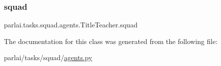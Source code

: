 \subsubsection{\texorpdfstring{squad}{squad}}
{\footnotesize\ttfamily parlai.\+tasks.\+squad.\+agents.\+Title\+Teacher.\+squad}



The documentation for this class was generated from the following file\+:\begin{DoxyCompactItemize}
\item 
parlai/tasks/squad/\hyperlink{parlai_2tasks_2squad_2agents_8py}{agents.\+py}\end{DoxyCompactItemize}
